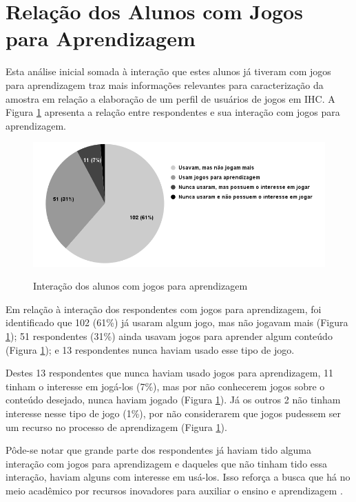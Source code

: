 \section{Relação dos Alunos com Jogos para Aprendizagem}
Esta análise inicial somada à interação que estes alunos já tiveram com jogos para aprendizagem traz mais informações relevantes para caracterização da amostra em relação a elaboração de um perfil de usuários de jogos em IHC. A Figura \ref{Fig:uso-jogo.png} apresenta a relação entre respondentes e sua interação com jogos para aprendizagem.

\begin{figure}[htbp]
	\centering
	\caption{Interação dos alunos com jogos para aprendizagem}
	\includegraphics[keepaspectratio=true,scale=0.5]{figuras/resultados/uso-jogo.png}
	\label{Fig:uso-jogo.png}
\end{figure}

Em relação à interação dos respondentes com jogos para aprendizagem, foi identificado que 102 (61\%) já usaram algum jogo, mas não jogavam mais (Figura \ref{Fig:uso-jogo.png});  51 respondentes (31\%) ainda usavam jogos para aprender algum conteúdo (Figura \ref{Fig:uso-jogo.png}); e 13 respondentes nunca haviam usado esse tipo de jogo. 

Destes 13 respondentes que nunca haviam usado jogos para aprendizagem, 11 tinham o interesse em jogá-los (7\%), mas por não conhecerem jogos sobre o conteúdo desejado, nunca haviam jogado (Figura \ref{Fig:uso-jogo.png}). Já os outros 2 não tinham interesse nesse tipo de jogo (1\%), por não considerarem que jogos pudessem ser um recurso no processo de aprendizagem (Figura \ref{Fig:uso-jogo.png}).

Pôde-se notar que grande parte dos respondentes já haviam tido alguma interação com jogos para aprendizagem e daqueles que não tinham tido essa interação, haviam alguns com interesse em usá-los. Isso reforça a busca que há no meio acadêmico por recursos inovadores para auxiliar o ensino e aprendizagem \cite{battistella,brito,Sales2020,Sales2020UsoTDS}.

